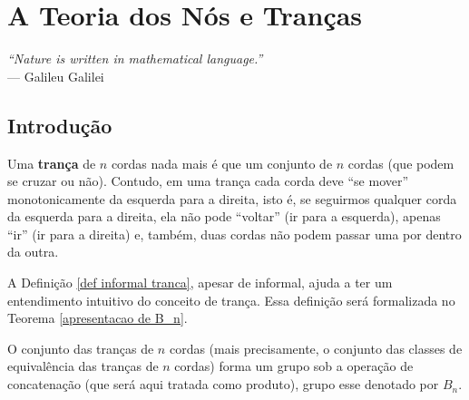 \chapter[A Teoria dos Nós e Tranças]{A Teoria dos Nós e Tranças}
\label{cap-3}
\chaptermark{}
%
\hfill%
\begin{minipage}{10cm}
\begin{flushright}
\rightskip=0.5cm
\textit{``Nature is written in mathematical language.''}
\\[0.1cm]
\rightskip=0.5cm
--- Galileu Galilei
\end{flushright}
\end{minipage}

\section{Introdução}
    \begin{definition}
    \label{def informal tranca}
    	Uma \textbf{trança} de $n$ cordas nada mais é que um conjunto de $n$ cordas (que podem se cruzar ou não).
    	Contudo, em uma trança cada corda deve ``se mover'' monotonicamente da esquerda para a direita, isto é, 
    	se seguirmos qualquer corda da esquerda para a direita, ela não pode ``voltar'' (ir para a esquerda),
    	apenas ``ir'' (ir para a direita) e, também, duas cordas não podem passar uma por dentro da outra.
    \end{definition}
    \par\vspace{0.3cm} A Definição \ref{def informal tranca}, apesar de informal, ajuda a ter um entendimento
    intuitivo do conceito de trança. Essa definição será formalizada no Teorema \ref{apresentacao de B_n}.
    	
	\par\vspace{0.3cm} O conjunto das tranças de $n$ cordas (mais precisamente, o conjunto das classes 
	de equivalência das tranças de $n$ cordas) forma um grupo sob a operação de concatenação 
	(que será aqui tratada como produto), grupo esse denotado por $B_n$. 
	

